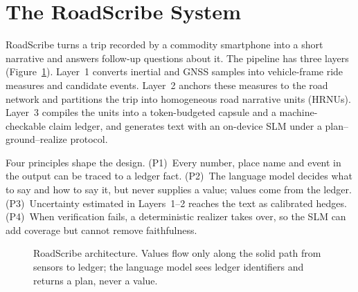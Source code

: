 \providecommand{\R}{\mathbb{R}}
\providecommand{\ind}{\mathbf{1}}
\providecommand{\TBD}[1][]{\textcolor{red}{[TBD#1]}}

\section{The RoadScribe System}
\label{sec:system}

RoadScribe turns a trip recorded by a commodity smartphone into a short narrative and answers follow-up questions about it.
The pipeline has three layers (Figure~\ref{fig:arch}).
Layer~1 converts inertial and GNSS samples into vehicle-frame ride measures and candidate events.
Layer~2 anchors these measures to the road network and partitions the trip into homogeneous road narrative units (HRNUs).
Layer~3 compiles the units into a token-budgeted capsule and a machine-checkable claim ledger, and generates text with an on-device SLM under a plan--ground--realize protocol.

Four principles shape the design.
(P1)~Every number, place name and event in the output can be traced to a ledger fact.
(P2)~The language model decides what to say and how to say it, but never supplies a value; values come from the ledger.
(P3)~Uncertainty estimated in Layers~1--2 reaches the text as calibrated hedges.
(P4)~When verification fails, a deterministic realizer takes over, so the SLM can add coverage but cannot remove faithfulness.

\begin{figure}[t]
  \centering
  \caption{RoadScribe architecture. Values flow only along the solid path from sensors to ledger; the language model sees ledger identifiers and returns a plan, never a value.}
  \label{fig:arch}
\end{figure}

